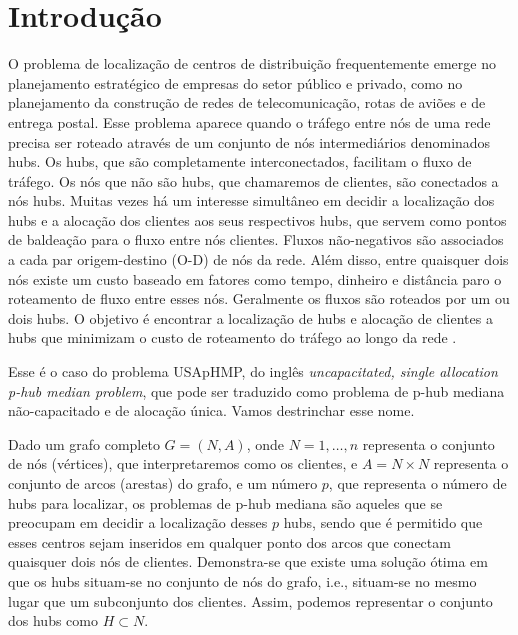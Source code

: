 



\clearpage

\section{Introdução}

O problema de localização de centros de distribuição frequentemente emerge no planejamento estratégico de empresas do setor público e privado, como no planejamento da construção de redes de telecomunicação, rotas de aviões e de entrega postal. Esse problema aparece quando o tráfego entre nós de uma rede precisa ser roteado através de um conjunto de nós intermediários denominados hubs. Os hubs, que são completamente interconectados, facilitam o fluxo de tráfego. Os nós que não são hubs, que chamaremos de clientes, são conectados a nós hubs. Muitas vezes há um interesse simultâneo em decidir a localização dos hubs e a alocação dos clientes aos seus respectivos hubs, que servem como pontos de baldeação para o fluxo entre nós clientes. Fluxos não-negativos são associados a cada par origem-destino (O-D) de nós da rede. Além disso, entre quaisquer dois nós existe um custo baseado em fatores como tempo, dinheiro e distância paro o roteamento de fluxo entre esses nós. Geralmente os fluxos são roteados por um ou dois hubs. O objetivo é encontrar a localização de hubs e alocação de clientes a hubs que minimizam o custo de roteamento do tráfego ao longo da rede \cite{Ernst1996}.

 Esse é o caso do problema USApHMP, do inglês \textit{uncapacitated, single allocation p-hub median problem}, que pode ser traduzido como problema de p-hub mediana não-capacitado e de alocação única. Vamos destrinchar esse nome.

Dado um grafo completo $G = (N, A)$, onde $N = {1,\dots, n}$ representa o conjunto de nós (vértices), que interpretaremos como os clientes, e $A = N \times N$ representa o conjunto de arcos (arestas) do grafo, e um número $p$, que representa o número de hubs para localizar, os problemas de p-hub mediana são aqueles que se preocupam em decidir a localização desses $p$ hubs, sendo que é permitido que esses centros sejam inseridos em qualquer ponto dos arcos que conectam quaisquer dois nós de clientes. Demonstra-se \cite{Arenales2015} que existe uma solução ótima em que os hubs situam-se no conjunto de nós do grafo, i.e., situam-se no mesmo lugar que um subconjunto dos clientes. Assim, podemos representar o conjunto dos hubs como $H \subset N$.

